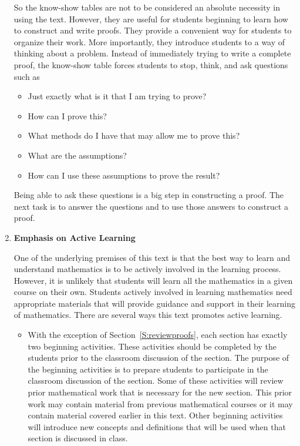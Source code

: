 \begin{enumerate}
So the know-show tables are not to be considered an absolute necessity in using the text.  However, they are useful for students beginning to learn how to construct and write proofs.  They provide a convenient way for students to organize their work.  More importantly, they introduce students to a way of thinking about a problem.  Instead of immediately trying to write a complete proof, the know-show table forces students to stop, think, and ask questions such as

\begin{itemize}
\item Just exactly what is it that I am trying to prove?
\item How can I prove this?
\item What methods do I have that may allow me to prove this?
\item What are the assumptions?
\item How can I use these assumptions to prove the result?
\end{itemize}

Being able to ask these questions is a big step in constructing a proof.  The next task is to answer the questions and to use those answers to construct a proof.


\item \textbf{Emphasis on Active Learning}

One of the underlying premises of this text is that the best way to learn and understand mathematics is to be actively involved in the learning process.  However, it is unlikely that  students will learn all the mathematics in a given course on their own.  Students actively involved in learning mathematics need appropriate materials that will provide guidance and support in their learning of mathematics.  There are several ways this text promotes active learning.  %
\begin{itemize}
\item With the exception of Section~\ref{S:reviewproofs}, each section has exactly two beginning activities.  These activities should be completed by the students prior to the classroom discussion of the section.  The purpose of the beginning activities is to prepare students to participate in the classroom discussion of the section.  Some of these activities will review prior mathematical work that is necessary for the new section.  This prior work may contain material from previous mathematical courses or it may contain material covered earlier in this text.  Other beginning activities will introduce new concepts and definitions that will be used when that section is discussed in class.


\end{itemize}
\end{enumerate}
